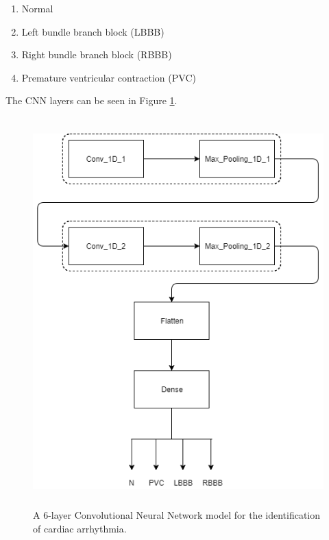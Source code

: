 \begin{enumerate}
	\item Normal
	\item Left bundle branch block (LBBB)
	\item Right bundle branch block (RBBB)
	\item Premature ventricular contraction (PVC)
\end{enumerate}

The CNN layers can be seen in Figure \ref{fig:cnn_model}.

\begin{figure}[htpb]
	\centering
	\includegraphics[width=20cm,height=15cm,keepaspectratio=true]{images/cnn_model}
	\caption{
		A 6-layer Convolutional Neural Network model for the identification of cardiac arrhythmia.
	}
	\label{fig:cnn_model}
\end{figure}


